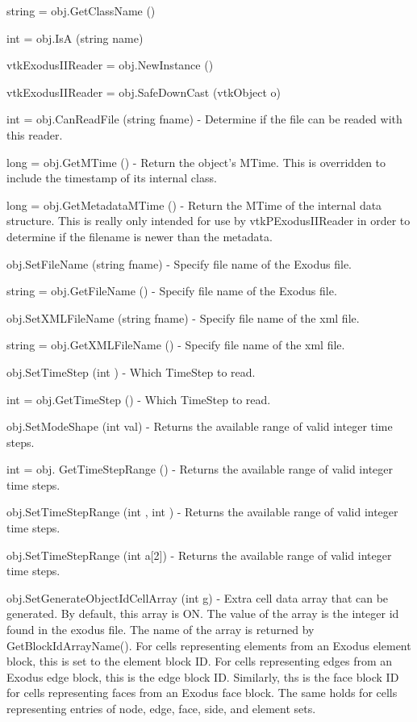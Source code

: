 \begin{DoxyItemize}
\item {\ttfamily string = obj.\-Get\-Class\-Name ()}  
\item {\ttfamily int = obj.\-Is\-A (string name)}  
\item {\ttfamily vtk\-Exodus\-I\-I\-Reader = obj.\-New\-Instance ()}  
\item {\ttfamily vtk\-Exodus\-I\-I\-Reader = obj.\-Safe\-Down\-Cast (vtk\-Object o)}  
\item {\ttfamily int = obj.\-Can\-Read\-File (string fname)} -\/ Determine if the file can be readed with this reader.  
\item {\ttfamily long = obj.\-Get\-M\-Time ()} -\/ Return the object's M\-Time. This is overridden to include the timestamp of its internal class.  
\item {\ttfamily long = obj.\-Get\-Metadata\-M\-Time ()} -\/ Return the M\-Time of the internal data structure. This is really only intended for use by vtk\-P\-Exodus\-I\-I\-Reader in order to determine if the filename is newer than the metadata.  
\item {\ttfamily obj.\-Set\-File\-Name (string fname)} -\/ Specify file name of the Exodus file.  
\item {\ttfamily string = obj.\-Get\-File\-Name ()} -\/ Specify file name of the Exodus file.  
\item {\ttfamily obj.\-Set\-X\-M\-L\-File\-Name (string fname)} -\/ Specify file name of the xml file.  
\item {\ttfamily string = obj.\-Get\-X\-M\-L\-File\-Name ()} -\/ Specify file name of the xml file.  
\item {\ttfamily obj.\-Set\-Time\-Step (int )} -\/ Which Time\-Step to read.  
\item {\ttfamily int = obj.\-Get\-Time\-Step ()} -\/ Which Time\-Step to read.  
\item {\ttfamily obj.\-Set\-Mode\-Shape (int val)} -\/ Returns the available range of valid integer time steps.  
\item {\ttfamily int = obj. Get\-Time\-Step\-Range ()} -\/ Returns the available range of valid integer time steps.  
\item {\ttfamily obj.\-Set\-Time\-Step\-Range (int , int )} -\/ Returns the available range of valid integer time steps.  
\item {\ttfamily obj.\-Set\-Time\-Step\-Range (int a\mbox{[}2\mbox{]})} -\/ Returns the available range of valid integer time steps.  
\item {\ttfamily obj.\-Set\-Generate\-Object\-Id\-Cell\-Array (int g)} -\/ Extra cell data array that can be generated. By default, this array is O\-N. The value of the array is the integer id found in the exodus file. The name of the array is returned by Get\-Block\-Id\-Array\-Name(). For cells representing elements from an Exodus element block, this is set to the element block I\-D. For cells representing edges from an Exodus edge block, this is the edge block I\-D. Similarly, ths is the face block I\-D for cells representing faces from an Exodus face block. The same holds for cells representing entries of node, edge, face, side, and element sets.  

\end{DoxyItemize}
